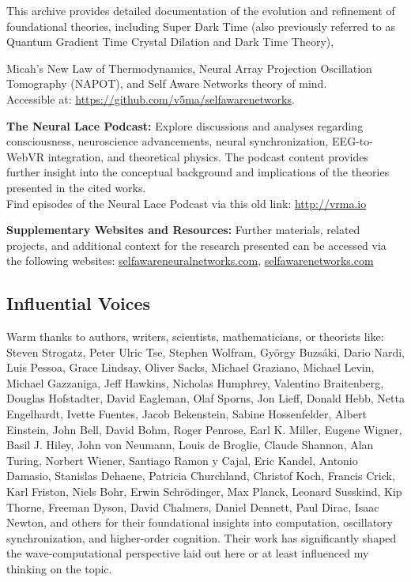 \documentclass[american,11pt,letterpaper]{article}
\begin{document}
This archive provides detailed documentation of the evolution and refinement of foundational theories, including Super Dark Time (also previously referred to as Quantum Gradient Time Crystal Dilation and Dark Time Theory),

Micah's New Law of Thermodynamics, Neural Array Projection Oscillation Tomography (NAPOT), and Self Aware Networks theory of mind.\\Accessible at: \href{https://github.com/v5ma/selfawarenetworks}{https://github.com/v5ma/selfawarenetworks}.

\medskip
\noindent \textbf{The Neural Lace Podcast:} Explore discussions and analyses regarding consciousness, neuroscience advancements, neural synchronization, EEG-to-WebVR integration, and theoretical physics. The podcast content provides further insight into the conceptual background and implications of the theories presented in the cited works.\\Find episodes of the Neural Lace Podcast via this old link: \href{http://vrma.io}{http://vrma.io}

\medskip

\noindent \textbf{Supplementary Websites and Resources:} Further materials, related projects, and additional context for the research presented can be accessed via the following websites: \href{http://selfawareneuralnetworks.com}{selfawareneuralnetworks.com}, \href{http://selfawarenetworks.com}{selfawarenetworks.com}

\subsection{Influential Voices}
Warm thanks to authors, writers, scientists, mathematicians, or theorists like: Steven Strogatz, 
Peter Ulric Tse, Stephen Wolfram, Gy\"orgy Buzs\'aki, Dario Nardi, Luis Pessoa, Grace Lindsay, 
Oliver Sacks, Michael Graziano, Michael Levin, Michael Gazzaniga, Jeff Hawkins, Nicholas Humphrey, 
Valentino Braitenberg, Douglas Hofstadter, David Eagleman, Olaf Sporns, Jon Lieff, Donald Hebb, 
Netta Engelhardt, Ivette Fuentes, Jacob Bekenstein, Sabine Hossenfelder, Albert Einstein, John Bell, 
David Bohm, Roger Penrose, Earl K. Miller, Eugene Wigner, Basil J. Hiley, John von Neumann, 
Louis de Broglie, Claude Shannon, Alan Turing, Norbert Wiener, Santiago Ramon y Cajal, Eric Kandel, 
Antonio Damasio, Stanislas Dehaene, Patricia Churchland, Christof Koch, Francis Crick, 
Karl Friston, Niels Bohr, Erwin Schr\"odinger, Max Planck, Leonard Susskind, Kip Thorne, 
Freeman Dyson, David Chalmers, Daniel Dennett, Paul Dirac, Isaac Newton, and others for their 
foundational insights into computation, oscillatory synchronization, and higher-order cognition. 
Their work has significantly shaped the wave-computational perspective laid out here or at least 
influenced my thinking on the topic.
\end{document}
